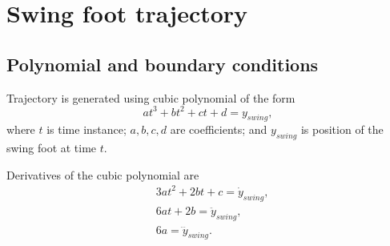 \section{Swing foot trajectory}

\subsection{Polynomial and boundary conditions}
Trajectory is generated using cubic polynomial of the form
\begin{equation}
    at^3 + bt^2 + ct + d = y_{swing},
\end{equation}
where $t$ is time instance; $a,b,c,d$ are coefficients; and $y_{swing}$ is position of the swing
foot at time $t$.

Derivatives of the cubic polynomial are
\begin{equation}
\begin{split}
    & 3at^2 + 2bt + c = \dot{y}_{swing},\\
    & 6at + 2b = \ddot{y}_{swing},\\
    & 6a = \dddot{y}_{swing}.\\
\end{split}
\end{equation}

